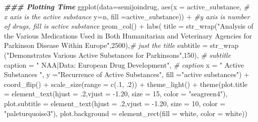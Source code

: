 \documentclass[
]{article}
\newenvironment{Shaded}{\begin{snugshade}}{\end{snugshade}}
\newcommand{\AttributeTok}[1]{\textcolor[rgb]{0.77,0.63,0.00}{#1}}
\newcommand{\CommentTok}[1]{\textcolor[rgb]{0.56,0.35,0.01}{\textit{#1}}}
\newcommand{\DecValTok}[1]{\textcolor[rgb]{0.00,0.00,0.81}{#1}}
\newcommand{\DocumentationTok}[1]{\textcolor[rgb]{0.56,0.35,0.01}{\textbf{\textit{#1}}}}
\newcommand{\FloatTok}[1]{\textcolor[rgb]{0.00,0.00,0.81}{#1}}
\newcommand{\FunctionTok}[1]{\textcolor[rgb]{0.00,0.00,0.00}{#1}}
\newcommand{\NormalTok}[1]{#1}
\newcommand{\SpecialCharTok}[1]{\textcolor[rgb]{0.00,0.00,0.00}{#1}}
\newcommand{\StringTok}[1]{\textcolor[rgb]{0.31,0.60,0.02}{#1}}
\begin{document}
\begin{Shaded}
\begin{Highlighting}[]
\DocumentationTok{\#\#\# Plotting Time}
  \FunctionTok{ggplot}\NormalTok{(}\AttributeTok{data=}\NormalTok{semijoindrug,}
    \FunctionTok{aes}\NormalTok{(}\AttributeTok{x =}\NormalTok{ active\_substance,     }\CommentTok{\# x axis is the active substance}
        \AttributeTok{y=}\NormalTok{n,}
        \AttributeTok{fill =}\NormalTok{active\_substance)) }\SpecialCharTok{+}  \CommentTok{\#y axis is number of drugs, fill is active substance}
  \FunctionTok{geom\_col}\NormalTok{() }\SpecialCharTok{+}  
  \FunctionTok{labs}\NormalTok{(}
    \AttributeTok{title =} \FunctionTok{str\_wrap}\NormalTok{(}\StringTok{"Analysis of the Various Medications Used in Both Humanitarian and Veterinary Agencies for Parkinson Disease Within Europe"}\NormalTok{,}\DecValTok{2500}\NormalTok{),}\CommentTok{\# just the title}
    \AttributeTok{subtitle =} \FunctionTok{str\_wrap}\NormalTok{ (}\StringTok{"Demonstrates Various Active Substances for Parkinsons"}\NormalTok{,}\DecValTok{150}\NormalTok{),   }\CommentTok{\# subtitle}
    \AttributeTok{caption =} \StringTok{" NAA|Data: European Drug Development"}\NormalTok{, }\CommentTok{\# caption}
    \AttributeTok{x =} \StringTok{" Active Substances "}\NormalTok{,}
    \AttributeTok{y =}\StringTok{"Recurrence of Active Substances"}\NormalTok{,}
    \AttributeTok{fill =}\StringTok{"active substances"}\NormalTok{) }\SpecialCharTok{+}
  \FunctionTok{coord\_flip}\NormalTok{() }\SpecialCharTok{+}
  \FunctionTok{scale\_size}\NormalTok{(}\AttributeTok{range =} \FunctionTok{c}\NormalTok{(.}\DecValTok{1}\NormalTok{, .}\DecValTok{2}\NormalTok{)) }\SpecialCharTok{+}
  \FunctionTok{theme\_light}\NormalTok{() }\SpecialCharTok{+}
  \FunctionTok{theme}\NormalTok{(}\AttributeTok{plot.title =} \FunctionTok{element\_text}\NormalTok{(}\AttributeTok{hjust =}\NormalTok{ .}\DecValTok{2}\NormalTok{,}\AttributeTok{vjust =} \SpecialCharTok{{-}}\FloatTok{1.20}\NormalTok{, }\AttributeTok{size =} \DecValTok{15}\NormalTok{, }\AttributeTok{color =} \StringTok{"seagreen4"}\NormalTok{),}
        \AttributeTok{plot.subtitle =} \FunctionTok{element\_text}\NormalTok{(}\AttributeTok{hjust =}\NormalTok{ .}\DecValTok{2}\NormalTok{,}\AttributeTok{vjust =} \SpecialCharTok{{-}}\FloatTok{1.20}\NormalTok{, }\AttributeTok{size =} \DecValTok{10}\NormalTok{, }\AttributeTok{color =} \StringTok{"paleturquoise3"}\NormalTok{),}
        \AttributeTok{plot.background =} \FunctionTok{element\_rect}\NormalTok{(}\AttributeTok{fill =} \StringTok{\textquotesingle{}white\textquotesingle{}}\NormalTok{, }\AttributeTok{color =} \StringTok{\textquotesingle{}white\textquotesingle{}}\NormalTok{))}
\end{Highlighting}
\end{Shaded}
\end{document}
